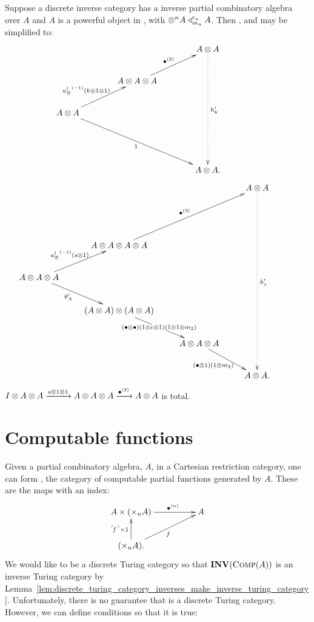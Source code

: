 \begin{lemma}\label{lem:powerful_inverse_partial_combinatory_algebra}
  Suppose a discrete inverse category \X has a inverse partial combinatory algebra over $A$ and $A$
  is  a powerful object in \X, with $\otimes^n A \triangleleft_{m_n}^{r_n} A$. Then ,
   and  may be simplified to:\\
    \[
      \xymatrix@C+15pt{
         && A\*A \ar@{.>}[dddd]^{h'_k}\\
        &A\* A\* A \ar[ur]^{\multibullet{2}} & & \\
        A\* A \ar[ur]^{\inv{\usl}(k\*1\*1)\ \ } \ar[ddrr]_{1} && &\\
         && & \\
        && A\*A. &
      }
    \]
    \[
      \xymatrix{
        &&& A\* A \ar@{.>}[dddddd]^{h'_s} \\
        & &  && \\
        &A\* A\* A\* A
          \ar[uurr]^{\multibullet{3}}\\
        A\* A\* A \ar[ur]^{\inv{\usl}(s\*1)\,} \ar[dr]_(.4){\theta_A'}\\
        &(A\* A) \* (A\* A) \ar[dr]|{(\bullet\*\bullet)(1\*c\*1)(1\*1\*m_2)} \\
        & &A\* A\* A\ar[dr]_{(\bullet\*1)(1\*m_2)\ }& &\\
        &&&A\*A. \\
      }
    \]
    $I\otimes A\otimes A \xrightarrow{s\otimes1\otimes1} A\otimes A\otimes A \xrightarrow{{\bullet}^{(2)}} A\otimes A$
   is total.
\end{lemma}

\section{Computable functions}
\label{sec:computable_functions}

Given a partial combinatory algebra, $A$, in a Cartesian restriction category, one can form \compa,
the category of computable partial functions generated by $A$. These are the maps with an index:
\[
  \xymatrix@C+25pt{
    A\times (\times_n A) \ar[r]^(.6){\multibullet{n}} & A \\
    (\times_n A). \ar[u]^{\name{f}\times 1} \ar[ur]_f
  }
\]
We would like \compa to be a discrete Turing category so that $\mathbf{INV}({\textsc{Comp}(A)})$ is an inverse Turing
category by
Lemma~\ref{lem:discrete_turing_category_inverses_make_inverse_turing_category}. Unfortunately, there
is no guarantee that \compa is a discrete Turing category.  However, we can define conditions
so that it is true:

